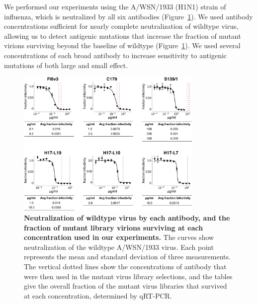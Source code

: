 \documentclass[11pt]{article}
\begin{document}
We performed our experiments using the A/WSN/1933 (H1N1) strain of influenza, which is neutralized by all six antibodies (Figure~\ref{fig:neutcurves}).
We used antibody concentrations sufficient for nearly complete neutralization of wildtype virus, allowing us to detect antigenic mutations that increase the fraction of mutant virions surviving beyond the baseline of wildtype (Figure~\ref{fig:neutcurves}). 
We used several concentrations of each broad antibody to increase sensitivity to antigenic mutations of both large and small effect.

\begin{figure}
\centerline{\includegraphics[width=0.8\textwidth]{figs/neutralization_curves/WT_neutralization_curves.pdf}}
\caption{\label{fig:neutcurves}
{\bf Neutralization of wildtype virus by each antibody, and the fraction of mutant library virions surviving at each concentration used in our experiments.}
The curves show neutralization of the wildtype A/WSN/1933 virus. 
Each point represents the mean and standard deviation of three measurements. 
The vertical dotted lines show the concentrations of antibody that were then used in the mutant virus library selections, and the tables give the overall fraction of the mutant virus libraries that survived at each concentration, determined by qRT-PCR.
}
\end{figure}
\end{document}
